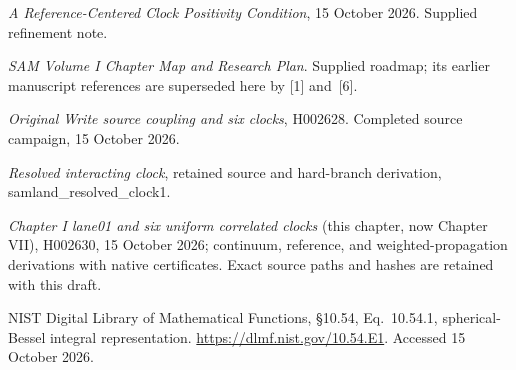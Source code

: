 \documentclass[10pt,twocolumn,letterpaper]{article}
\begin{document}
\noindent[2] \emph{A Reference-Centered Clock Positivity Condition}, 15 October 2026. Supplied refinement note.

\noindent[3] \emph{SAM Volume I Chapter Map and Research Plan}. Supplied roadmap; its earlier manuscript references are superseded here by [1] and~[6].

\noindent[4] \emph{Original Write source coupling and six clocks}, H002628. Completed source campaign, 15 October 2026.

\noindent[5] \emph{Resolved interacting clock}, retained source and hard-branch derivation, samland\_resolved\_clock1.

\noindent[6] \emph{Chapter I lane01 and six uniform correlated clocks} (this chapter, now Chapter VII), H002630, 15 October 2026; continuum, reference, and weighted-propagation derivations with native certificates. Exact source paths and hashes are retained with this draft.

\noindent[7] NIST Digital Library of Mathematical Functions, \S10.54, Eq.~10.54.1, spherical-Bessel integral representation. \url{https://dlmf.nist.gov/10.54.E1}. Accessed 15 October 2026.

\endgroup
\end{document}
